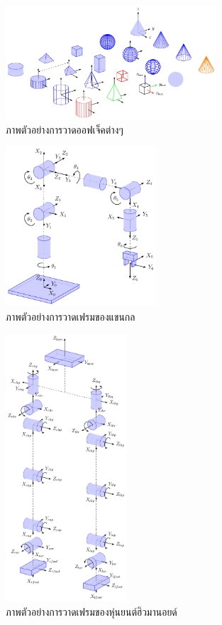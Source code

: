 \begin{figure}[!ht]
	\centering
	\includegraphics[width=0.7\textwidth]{chapter4/images/uthai_tools/basic-shapes.png}
	\caption{ภาพตัวอย่างการวาดออฟเจ็คต่างๆ}
	\label{fig:basic-shapes_sk}
\end{figure}
\begin{figure}[!ht]
	\centering
	\includegraphics[width=0.5\textwidth]{chapter4/images/uthai_tools/test_robot.png}
	\caption{ภาพตัวอย่างการวาดเฟรมของแขนกล}
	\label{fig:test-robot_sk}
\end{figure}
\begin{figure}[!ht]
	\centering
	\includegraphics[width=0.4\textwidth]{chapter4/images/uthai_tools/uthai_kinematics.png}
	\caption{ภาพตัวอย่างการวาดเฟรมของหุ่นยนต์ฮิวมานอยด์}
	\label{fig:uthai_kinematics_sk}
\end{figure}